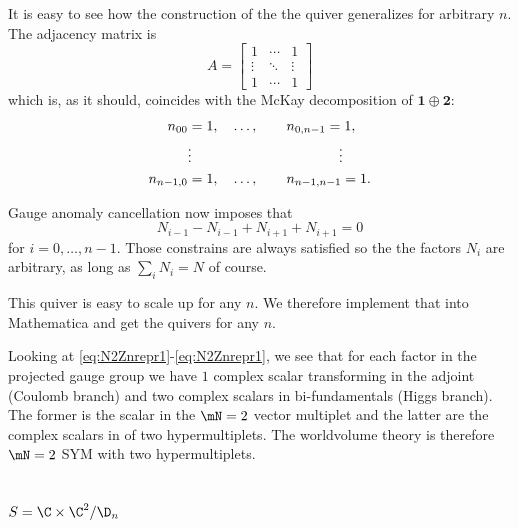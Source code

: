 \documentclass{worksheetclass}
\begin{document}
        It is easy to see how the construction of the the quiver generalizes for arbitrary $n$. The adjacency matrix is
        \begin{equation}
            A=
            \begin{bmatrix}
                1 & \cdots & 1 \\
                \vdots & \ddots & \vdots \\
                1 & \cdots & 1
            \end{bmatrix}
        \end{equation}
        which is, as it should, coincides with the McKay decomposition of $\boldsymbol{1}\oplus\boldsymbol{2}$:
        \begin{align}
            \begin{split}
                n_{00} &= 1,\quad\dots,\qquad n_{0,n-1}=1,\\
                &\vdots\hspace{3.7cm}\vdots\\
                n_{n-1,0} &= 1,\quad\dots,\qquad n_{n-1,n-1}=1.
            \end{split}
        \end{align}
        
        Gauge anomaly cancellation now imposes that
        \begin{equation}
            N_{i-1}-N_{i-1}+N_{i+1}+N_{i+1}=0
        \end{equation}
        for $i=0,\dots,n-1$. Those constrains are always satisfied so the the factors $N_i$ are arbitrary, as long as $\sum_iN_i=N$ of course.

        This quiver is easy to scale up for any $n$. We therefore implement that into Mathematica and get the quivers for any $n$.

        Looking at \eqref{eq:N2Znrepr1}-\eqref{eq:N2Znrepr1}, we see that for each factor in the projected gauge group we have $1$ complex scalar transforming in the adjoint (Coulomb branch) and two complex scalars in bi-fundamentals (Higgs branch). The former is the scalar in the $\mN=2$ vector multiplet and the latter are the complex scalars in of two hypermultiplets. The worldvolume theory is therefore $\mN=2$ SYM with two hypermultiplets.

    \subsection{$S=\C\times\C^2/\D_n$}
\end{document}
